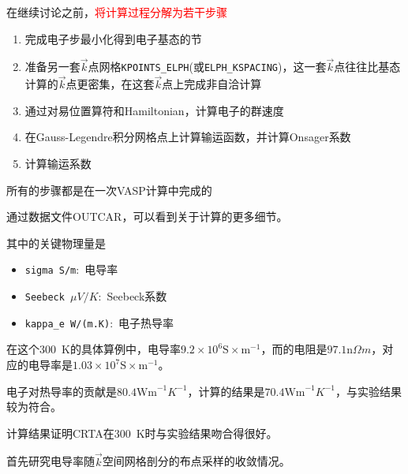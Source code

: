 {在继续讨论之前，\textcolor{red}{将计算过程分解为若干步骤}
\begin{enumerate}
	\item 完成电子步最小化得到电子基态的节
	\item 准备另一套$\vec k$点网格\texttt{KPOINTS\_ELPH}(或\texttt{ELPH\_KSPACING})，这一套$\vec k$点往往比基态计算的$\vec k$点更密集，在这套$\vec k$点上完成非自洽计算
	\item 通过对易位置算符和\textrm{Hamiltonian}，计算电子的群速度
	\item 在\textrm{Gauss-Legendre}积分网格点上计算输运函数，并计算\textrm{Onsager}系数
	\item 计算输运系数
\end{enumerate}
所有的步骤都是在一次\textrm{VASP}计算中完成的

通过数据文件\textrm{OUTCAR}，可以看到关于计算的更多细节。%





其中的关键物理量是
\begin{itemize}
	\item \texttt{sigma S/m}:~电导率%
	\item \texttt{Seebeck $\mu V/K$}:~Seebeck系数 
	\item \texttt{kappa\_e W/(m.K)}:~电子热导率
\end{itemize}
在这个\textrm{300~K}的具体算例中，电导率$9.2\times10^6\mathrm{S}\times\mathrm{m}^{-1}$，而的电阻是$97.1\mathrm{n}\Omega m$，对应的电导率是$1.03\times10^7\mathrm{S}\times\mathrm{m}^{-1}$。%

电子对热导率的贡献是$80.4\mathrm{Wm}^{-1}K^{-1}$，计算的结果是$70.4\mathrm{Wm}^{-1}K^{-1}$，与实验结果较为符合。

计算结果证明\textrm{CRTA}在\textrm{300~K}时与实验结果吻合得很好。%

首先研究电导率随$\vec k$空间网格剖分的布点采样的收敛情况。

}

